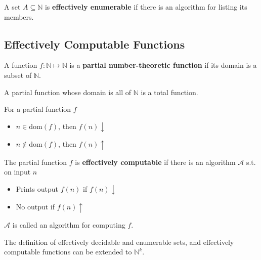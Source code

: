 \begin{definition}
    \label{def:EffectivelyEnumerableSet}
    A set $A \subseteq \mathbb{N}$ is \textbf{effectively enumerable} if there is an algorithm for listing its members.
\end{definition}

\subsection{Effectively Computable Functions}
\label{sub:EffectivelyComputableFunction}

\begin{definition}
    \label{def:PartialFunction}
    A function $f:\mathbb{N}\mapsto\mathbb{N}$ is a \textbf{partial number-theoretic function} if its domain is a subset of $\mathbb{N}$.
\end{definition}
\begin{definition}
    \label{def:TotalFunction}
    A partial function whose domain is all of $\mathbb{N}$ is a total function.
\end{definition}

\begin{definition}
    For a partial function $f$
    \begin{itemize}
        \item $n \in \textrm{dom}(f)$, then $f(n)\downarrow$
        \item $n \notin \textrm{dom}(f)$, then $f(n)\uparrow$
    \end{itemize}
\end{definition}

\begin{definition}
    \label{def:EffectivelyComputableFunction}
    The partial function $f$ is \textbf{effectively computable} if there is an algorithm $\mathcal{A}$ s.t. on input $n$
    \begin{itemize}
        \item Prints output $f(n)$ if $f(n)\downarrow$
        \item No output if $f(n)\uparrow$
    \end{itemize}
    $\mathcal{A}$ is called an algorithm for computing $f$.
\end{definition}

\begin{remark}
    The definition of effectively decidable and enumerable sets, and effectively computable functions can be extended to $\mathbb{N}^k$.
\end{remark}

